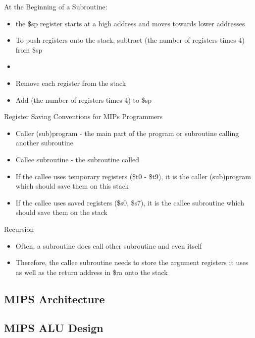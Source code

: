 \documentclass[12pt]{article}
\begin{document}
At the Beginning of a Subroutine: \begin{itemize} 
\item the \$sp register starts at a high address and moves towards lower addresses 
\item To push registers onto the stack, subtract (the number of registers times 4) from \$sp 
\item 
\item Remove each register from the stack 
\item Add (the number of registers times 4) to \$sp 
\end{itemize} 

Register Saving Conventions for MIPs Programmers \begin{itemize} 
\item Caller (sub)program - the main part of the program or subroutine calling another subroutine 
\item Callee subroutine - the subroutine called 
\item If the callee uses temporary registers (\$t0 - \$t9), it is the caller (sub)program which should save them on this stack 
\item If the callee uses saved registers (\$s0, \$s7), it is the callee subroutine which should save them on the stack 

\end{itemize} 

Recursion 
\begin{itemize} 
\item Often, a subroutine does call other subroutine and even itself 
\item Therefore, the callee subroutine needs to store the argument registers it uses as well as the return address in \$ra onto the stack 

\end{itemize}

\subsection{MIPS Architecture}

\subsection{MIPS ALU Design}
\end{document}
